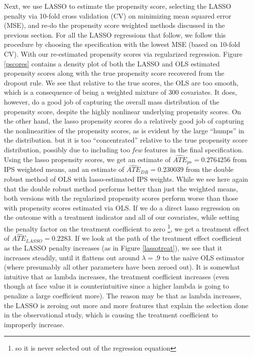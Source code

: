 \documentclass{article}
\begin{document}
Next, we use LASSO to estimate the propensity score, selecting the LASSO penalty via 10-fold cross validation (CV) on minimizing mean squared error (MSE), and re-do the propensity score weighted methods discussed in the previous section. For all the LASSO regressions that follow, we follow this procedure by choosing the specification with the lowest MSE (based on 10-fold CV). With our re-estimated propensity scores via regularized regression. Figure \ref{pscores} contains a density plot of both the LASSO and OLS estimated propensity scores along with the true propensity score recovered from the dropout rule. We see that relative to the true scores, the OLS are too smooth, which is a consequence of being a weighted mixture of 300 covariates. It does, however, do a good job of capturing the overall mass distribution of the propensity score, despite the highly nonlinear underlying propensity scores. On the other hand, the lasso propensity scores do a relatively good job of capturing the nonlinearities of the propensity scores, as is evident by the large ``humps'' in the distribution. but it is too ``concentrated'' relative to the true propensity score distribution, possibly due to including too \textit{few} features in the final specification. Using the lasso propensity scores, we get an estimate of  $\widehat{ATE}_{ps}=0.2764256$ from IPS weighted means, and an estimate of $\widehat{ATE}_{DR} = 0.230039$ from the double robust method of OLS with lasso-estimated IPS weights. While we see here again that the double robust method performs better than just the weighted means, both versions with the regularized propensity scores perform worse than those with propensity scores estimated via OLS. If we do a direct lasso regression on the outcome with a treatment indicator and all of our covariates, while setting the penalty factor on the treatment coefficient to zero \footnote{so it is never selected out of the regression equation}, we get a treatment effect of $\widehat{ATE}_{LASSO}=0.2283$. If we look at the path of the treatment effect coefficient as the LASSO penalty increases (as in Figure \ref{lassotreat}), we see that it increases steadily, until it flattens out around $\lambda=.9$ to the naive OLS estimator (where presumably all other parameters have been zeroed out). It is somewhat intuitive that as lambda increases, the treatment coefficient increases (even though at face value it is counterintuitive since a higher lambda is going to penalize a large coefficient more). The reason may be that as lambda increases, the LASSO is zeroing out more and more features that explain the selection done in the observational study, which  is causing the treatment coefficient to improperly increase.
\end{document}
